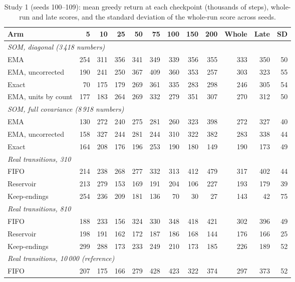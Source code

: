 \documentclass{article}
\begin{document}
\begin{table}[h]
\caption{Study 1 (seeds 100--109): mean greedy return at each checkpoint
(thousands of steps), whole-run and late scores, and the standard deviation
of the whole-run score across seeds.}
\label{tab:all}
\centering
\small
\begin{tabular}{lrrrrrrrrrrr}
\toprule
Arm & 5 & 10 & 25 & 50 & 75 & 100 & 150 & 200 & Whole & Late & SD \\
\midrule
\multicolumn{12}{l}{\emph{SOM, diagonal (3\,418 numbers)}} \\
EMA & 254 & 311 & 356 & 341 & 349 & 339 & 356 & 355 & 333 & 350 & 50 \\
EMA, uncorrected & 190 & 241 & 250 & 367 & 409 & 360 & 353 & 257 & 303 & 323 & 55 \\
Exact & 70 & 175 & 179 & 269 & 361 & 335 & 283 & 298 & 246 & 305 & 54 \\
EMA, units by count & 177 & 183 & 264 & 269 & 332 & 279 & 351 & 307 & 270 & 312 & 50 \\
\multicolumn{12}{l}{\emph{SOM, full covariance (8\,918 numbers)}} \\
EMA & 130 & 272 & 240 & 275 & 281 & 260 & 323 & 398 & 272 & 327 & 40 \\
EMA, uncorrected & 158 & 327 & 244 & 281 & 244 & 310 & 322 & 382 & 283 & 338 & 44 \\
Exact & 164 & 208 & 176 & 196 & 253 & 190 & 180 & 149 & 190 & 173 & 49 \\
\multicolumn{12}{l}{\emph{Real transitions, 310}} \\
FIFO & 214 & 238 & 268 & 277 & 332 & 313 & 412 & 479 & 317 & 402 & 44 \\
Reservoir & 213 & 279 & 153 & 169 & 191 & 204 & 106 & 227 & 193 & 179 & 39 \\
Keep-endings & 254 & 236 & 209 & 181 & 136 & 70 & 30 & 27 & 143 & 42 & 75 \\
\multicolumn{12}{l}{\emph{Real transitions, 810}} \\
FIFO & 188 & 233 & 156 & 324 & 330 & 348 & 418 & 421 & 302 & 396 & 49 \\
Reservoir & 198 & 191 & 162 & 172 & 187 & 186 & 168 & 144 & 176 & 166 & 25 \\
Keep-endings & 299 & 288 & 173 & 233 & 249 & 210 & 173 & 185 & 226 & 189 & 52 \\
\multicolumn{12}{l}{\emph{Real transitions, 10\,000 (reference)}} \\
FIFO & 207 & 175 & 166 & 279 & 428 & 423 & 322 & 374 & 297 & 373 & 52 \\
\bottomrule
\end{tabular}
\end{table}
\end{document}

